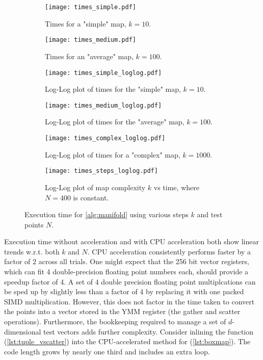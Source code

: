\begin{figure}[ht!]
    \centering
    \begin{subfigure}[t]{0.45\textwidth}
        \texttt{[image: times\_simple.pdf]}
        \caption{Times for a "simple" map, $k = 10$.}
        \label{fig:times:simple}
    \end{subfigure}
    \hfill
    \begin{subfigure}[t]{0.45\textwidth}
        \texttt{[image: times\_medium.pdf]}
        \caption{Times for an "average" map, $k = 100$.}
        \label{fig:times:med}
    \end{subfigure}
    \medskip
    \begin{subfigure}[t]{0.45\textwidth}
        \texttt{[image: times\_simple\_loglog.pdf]}
        \caption{Log-Log plot of times for the "simple" map, $k = 10$.}
        \label{fig:times:simple:loglog}
    \end{subfigure}
    \hfill
    \begin{subfigure}[t]{0.45\textwidth}
        \texttt{[image: times\_medium\_loglog.pdf]}
        \caption{Log-Log plot of times for the "average" map, $k = 100$.}
        \label{fig:times:med:loglog}
    \end{subfigure}
    \medskip
    \begin{subfigure}[t]{0.45\textwidth}
        \texttt{[image: times\_complex\_loglog.pdf]}
        \caption{Log-Log plot of times for a "complex" map, $k = 1000$.}
        \label{fig:times:complex:loglog}
    \end{subfigure}
    \hfill
    \begin{subfigure}[t]{0.45\textwidth}
        \texttt{[image: times\_steps\_loglog.pdf]}
        \caption{Log-Log plot of map complexity $k$ vs time, where $N = 400$ is constant.}
        \label{fig:times:steps:loglog}
    \end{subfigure}
    \caption{
        Execution time for \autoref{alg:manifold} using various steps $k$ and test points $N$. 
    }
    \label{fig:times}
\end{figure}

Execution time without acceleration and with CPU acceleration both show linear trends 
w.r.t. both $k$ and $N$. CPU acceleration consistently performs faster by a factor of 2 
across all trials. One might expect that the 256 bit vector registers, which can fit 4 
double-precision floating point numbers each, should provide a speedup factor of 4. 
A set of 4 double precision floating point multiplcations can be sped up by slightly less 
than a factor of 4 by replacing it with one packed SIMD multiplication. However, this does 
not factor in the time taken to convert the points into a vector stored in the YMM 
register (the gather and scatter operations). Furthermore, the bookkeeping required to 
manage a set of $d$-dimensional test vectors adds further complexity. Consider inlining 
the function  (\autoref{lst:tuple_vscatter}) into the 
CPU-accelerated method for  (\autoref{lst:boxmap}). The code length grows 
by nearly one third and includes an extra  loop. \\

